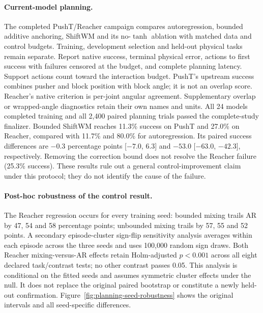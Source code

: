 \paragraph{Current-model planning.}
The completed PushT/Reacher campaign compares autoregression, bounded additive anchoring,
ShiftWM and its no-$\tanh$ ablation with matched data and control budgets.
Training, development selection and held-out physical tasks remain separate.
Report native success, terminal physical error, actions to first success with
failures censored at the budget, and complete planning latency. Support actions
count toward the interaction budget. PushT's upstream success combines pusher
and block position with block angle; it is not an overlap score. Reacher's native
criterion is per-joint angular agreement. Supplementary overlap or wrapped-angle
diagnostics retain their own names and units. All 24 models completed training and all 2,400 paired planning trials passed
the complete-study finalizer. Bounded ShiftWM reaches 11.3\% success on PushT
and 27.0\% on Reacher, compared with 11.7\% and 80.0\% for autoregression.
Its paired success differences are $-0.3$ percentage points
[$-7.0$, $6.3$] and $-53.0$ [$-63.0$, $-42.3$], respectively.
Removing the correction bound does not resolve the Reacher failure
(25.3\% success). These results rule out a general control-improvement claim
under this protocol; they do not identify the cause of the failure.



\paragraph{Post-hoc robustness of the control result.}
The Reacher regression occurs for every training seed: bounded mixing trails
AR by 47, 54 and 58 percentage points; unbounded mixing trails by 57, 55 and
52 points. A secondary episode-cluster sign-flip sensitivity analysis averages
within each episode across the three seeds and uses 100,000 random sign draws.
Both Reacher mixing-versus-AR effects retain Holm-adjusted $p<0.001$ across
all eight declared task/contrast tests; no other contrast passes 0.05.
This analysis is conditional on the fitted seeds and assumes symmetric cluster
effects under the null. It does not replace the original paired bootstrap or
constitute a newly held-out confirmation. Figure~\ref{fig:planning-seed-robustness}
shows the original intervals and all seed-specific differences.


